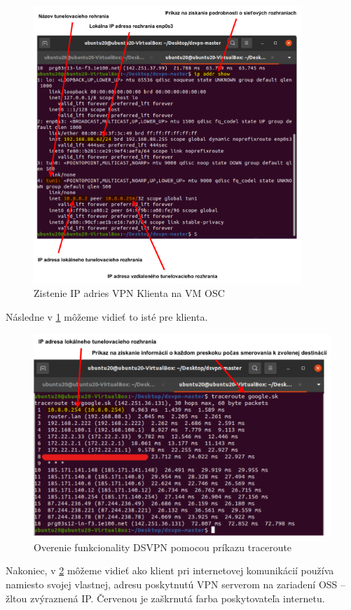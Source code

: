 \begin{figure}[!h]
	\centering
	\includegraphics[width=0.9\textwidth]{figures/ipu20}
	\caption{Zistenie IP adries VPN Klienta na VM OSC}
	\label{ipu20}
\end{figure}
Následne v \ref{ipu20} môžeme vidieť to isté pre klienta.
  
\begin{figure}[!h]
	\centering
	\includegraphics[width=1\textwidth]{figures/vpntru20}
	\caption{Overenie funkcionality DSVPN pomocou príkazu traceroute}
	\label{vpntru20}
\end{figure}
Nakoniec, v \ref{vpntru20} môžeme vidieť ako klient pri internetovej komunikácií používa namiesto svojej vlastnej, adresu poskytnutú VPN serverom na zariadení OSS -- žltou zvýraznená IP. Červenou je zaškrnutá farba poskytovateľa internetu. 

